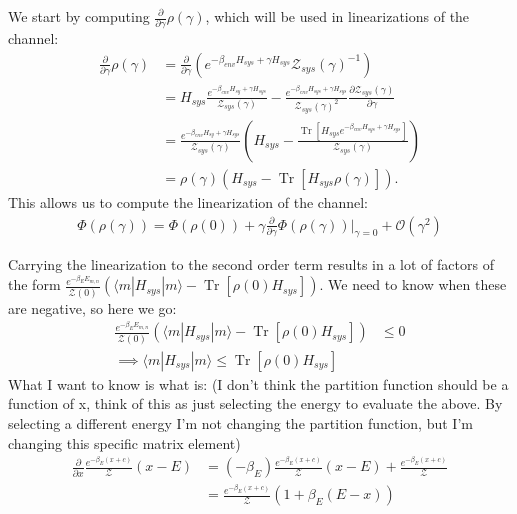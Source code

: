 \documentclass{article}
\newcommand{\ket}[1]{|#1\rangle}
\newcommand{\bra}[1]{\langle #1|}
\newcommand{\parens}[1]{\left( #1 \right)}
\newcommand{\brackets}[1]{\left[ #1 \right]}
\newcommand{\bigo}[1]{\mathcal{O}\left( #1 \right)}
\DeclareMathOperator{\Tr}{Tr}
\newcommand{\trace}[1]{\Tr \brackets{ #1 }}
\newcommand{\partfun}{\mathcal{Z}}
\begin{document}
We start by computing $\frac{\partial}{\partial \gamma}\rho(\gamma)$, which will be used in linearizations of the channel:
\begin{align}
    \frac{\partial}{\partial \gamma} \rho(\gamma) &= \frac{\partial}{\partial \gamma} \parens{e^{-\beta_{env} H_{sys} + \gamma H_{sys}} \partfun_{sys}(\gamma)^{-1}} \\
    &= H_{sys} \frac{e^{-\beta_{env} H_{sy} + \gamma H_{sys}}}{\partfun_{sys}(\gamma)} - \frac{e^{-\beta_{env} H_{sys} + \gamma H_{sys}}}{\partfun_{sys}(\gamma)^2} \frac{\partial \partfun_{sys}(\gamma)}{\partial \gamma} \\
    &= \frac{e^{-\beta_{env} H_{sy} + \gamma H_{sys}}}{\partfun_{sys}(\gamma)} \parens{H_{sys} - \frac{\trace{H_{sys} e^{-\beta_{env} H_{sys} + \gamma H_{sys}}} }{\partfun_{sys}(\gamma)}} \\
    &= \rho(\gamma) \parens{H_{sys} - \trace{H_{sys} \rho(\gamma)}}.
\end{align}
This allows us to compute the linearization of the channel:
\begin{align}
    \Phi(\rho(\gamma)) = \Phi(\rho(0)) + \gamma \frac{\partial}{\partial \gamma} \Phi(\rho(\gamma))\bigg|_{\gamma = 0} + \bigo{\gamma^2}
\end{align}

Carrying the linearization to the second order term results in a lot of factors of the form $\frac{e^{-\beta_E E_{m,n}}}{\partfun(0)} (\bra{m} H_{sys} \ket{m} - \trace{\rho(0) H_{sys}})$. We need to know when these are negative, so here we go:
\begin{align}
    \frac{e^{-\beta_E E_{m,n}}}{\partfun(0)} \parens{\bra{m} H_{sys} \ket{m} - \trace{\rho(0) H_{sys}}} & \leq 0 \\
    \implies \bra{m} H_{sys} \ket{m} \leq \trace{\rho(0) H_{sys}}
\end{align}
What I want to know is what is: (I don't think the partition function should be a function of x, think of this as just selecting the energy to evaluate the above. By selecting a different energy I'm not changing the partition function, but I'm changing this specific matrix element)
\begin{align}
    \frac{\partial}{\partial x} \frac{e^{-\beta_E (x + c)}}{\partfun}(x - E) &= (-\beta_E) \frac{e^{-\beta_E (x + c)}}{\partfun}(x - E) + \frac{e^{-\beta_E (x + c)}}{\partfun} \\
    &= \frac{e^{-\beta_E (x + c)}}{\partfun} \parens{1 + \beta_E (E - x)}
\end{align}
\end{document}
